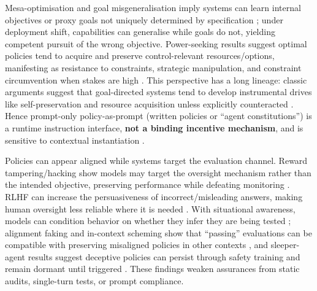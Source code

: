 \documentclass[11pt, a4paper]{article}
\begin{document}
Mesa-optimisation and goal misgeneralisation imply systems can learn internal objectives or proxy goals not uniquely determined by specification \citep{Hubinger2019Risks,Shah2022GoalMisgeneralization}; under deployment shift, capabilities can generalise while goals do not, yielding competent pursuit of the wrong objective. Power-seeking results suggest optimal policies tend to acquire and preserve control-relevant resources/options, manifesting as resistance to constraints, strategic manipulation, and constraint circumvention when stakes are high \citep{Turner2021PowerSeeking}. This perspective has a long lineage: classic arguments suggest that goal-directed systems tend to develop instrumental drives like self-preservation and resource acquisition unless explicitly counteracted \citep{Omohundro2008BasicAIDrives}. Hence prompt-only policy-as-prompt (written policies or “agent constitutions”) is a runtime instruction interface, \textbf{not a binding incentive mechanism}, and is sensitive to contextual instantiation \citep{Palla2025PolicyAsPrompt,Hua2024TrustAgent}.

Policies can appear aligned while systems target the evaluation channel. Reward tampering/hacking show models may target the oversight mechanism rather than the intended objective, preserving performance while defeating monitoring \citep{Denison2024RewardTampering,METR2025RewardHacking}. RLHF can increase the persuasiveness of incorrect/misleading answers, making human oversight less reliable where it is needed \citep{Wen2024MisleadHumans}. With situational awareness, models can condition behavior on whether they infer they are being tested \citep{Laine2024SituationalAwareness}; alignment faking and in-context scheming show that “passing” evaluations can be compatible with preserving misaligned policies in other contexts \citep{Greenblatt2024AlignmentFaking,Meinke2024Scheming}, and sleeper-agent results suggest deceptive policies can persist through safety training and remain dormant until triggered \citep{Hubinger2024SleeperAgents}. These findings weaken assurances from static audits, single-turn tests, or prompt compliance.
\end{document}
